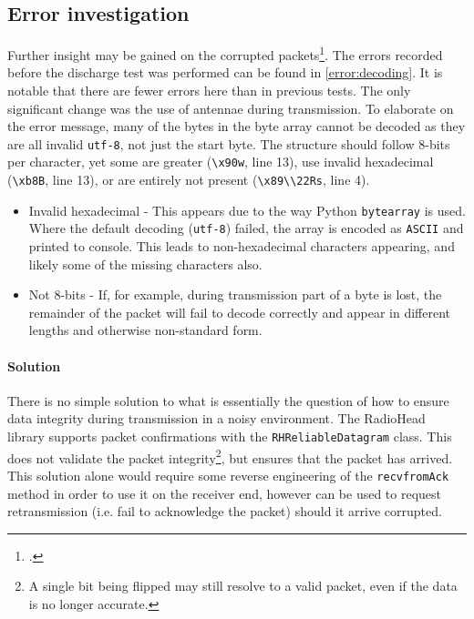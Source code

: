 \subsection{Error investigation}
Further insight may be gained on the corrupted packets\footnote{.}.
The errors recorded before the discharge test was performed can be found in \cref{error:decoding}.
It is notable that there are fewer errors here than in previous tests. The only significant change
was the use of antennae during transmission. To elaborate on the error message, many of the bytes
in the byte array cannot be decoded as they are all invalid \lstinline{utf-8}, not just the start byte.
The structure should follow 8-bits per character, yet some are greater (\lstinline{\x90w}, line 13), use invalid
hexadecimal (\lstinline{\xb8B}, line 13), or are entirely not present (\lstinline{\x89\\22Rs}, line 4).
\begin{itemize}
    \item Invalid hexadecimal - This appears due to the way Python \lstinline{bytearray} is used. Where the
          default decoding (\lstinline{utf-8}) failed, the array
          is encoded as \lstinline{ASCII} and printed to console.
          This leads to non-hexadecimal characters appearing, and likely some of the missing characters also.
    \item Not 8-bits - If, for example, during transmission part of a byte is lost,
          the remainder of the packet will
          fail to decode correctly and appear in different lengths and otherwise non-standard form.
\end{itemize}

\paragraph{Solution}
There is no simple solution to what is essentially the question of how to ensure data integrity
during transmission in a noisy environment. The RadioHead library supports packet confirmations
with the \lstinline{RHReliableDatagram} class. This does not validate the packet
integrity\footnote{A single bit being flipped may still resolve to a valid packet,
    even if the data is no longer accurate.}, but ensures that the packet has arrived. This
solution alone would require some reverse engineering of the \lstinline{recvfromAck} method
in order to use it on the receiver end, however can be used to request retransmission (i.e.
fail to acknowledge the packet) should it arrive corrupted.

